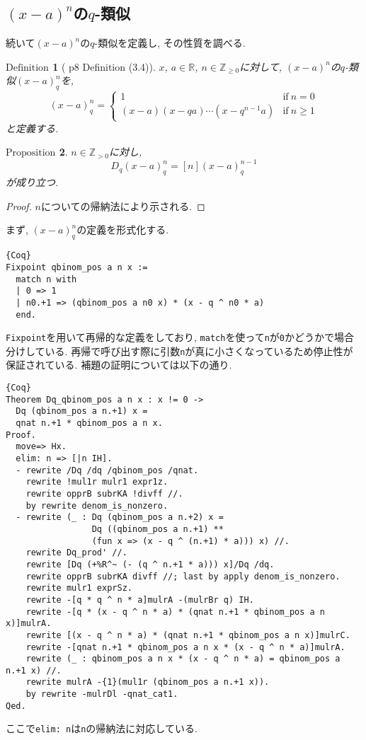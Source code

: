 \documentclass[11pt]{jsreport}
\theoremstyle{mystyle}
\newtheorem{df}{$\textrm{Definition}$}[subsection]
\newtheorem{prop}[df]{$\textrm{Proposition}$}
\newcommand{\bdf}{\begin{shadebox} \begin{df}}
\newcommand{\edf}{\end{df} \end{shadebox}}
\newcommand{\bprop}{\begin{shadebox} \begin{prop}}
\newcommand{\eprop}{\end{prop} \end{shadebox}}
\newcommand{\bpf}{\begin{proof}}
\newcommand{\epf}{\end{proof}}
\newcommand{\Z}{\mathbb{Z}}
\newcommand{\R}{\mathbb{R}}
\newcommand{\0}{\textbf{0}}
\newcommand{\1}{\textbf{1}}
\newcommand{\2}{\textbf{2}}
\begin{document}
\subsection{$(x - a)^n$の$q$-類似}
続いて$(x - a)^n$の$q$-類似を定義し, その性質を調べる.  
\bdf[\cite{Kac} p8 Definition (3.4)]
  $x$, $a \in \R$, $n \in \Z_{\ge 0}$に対して, $(x - a)^n$の$q$-類似$(x - a)^n_q$を, 
  \[
  (x - a)^n_q = \begin{cases}
                      1 & \text{if}\ n = 0 \\
                      (x - a) (x - qa) \cdots (x - q^{n - 1} a) & \text{if}\ n \ge 1
                    \end{cases}
  \]
  と定義する. 
\edf
\bprop \label{Dq_qbinom_nonneg}
  $n\in\Z_{>0}$に対し, 
  \[
    D_q(x-a)^n_q = [n](x-a)^{n-1}_q
  \]
  が成り立つ. 
\eprop
\bpf
  $n$についての帰納法により示される. 
\epf
まず, $(x - a)^n_q$の定義を形式化する. 
\begin{lstlisting}{Coq}
Fixpoint qbinom_pos a n x :=
  match n with
  | 0 => 1
  | n0.+1 => (qbinom_pos a n0 x) * (x - q ^ n0 * a)
  end. \end{lstlisting}
{\tt Fixpoint}を用いて再帰的な定義をしており, {\tt match}を使って{\tt n}が{\tt 0}かどうかで場合分けしている. 再帰で呼び出す際に引数{\tt n}が真に小さくなっているため停止性が保証されている. 補題の証明については以下の通り. 
\begin{lstlisting}{Coq}
Theorem Dq_qbinom_pos a n x : x != 0 ->
  Dq (qbinom_pos a n.+1) x =
  qnat n.+1 * qbinom_pos a n x.
Proof.
  move=> Hx.
  elim: n => [|n IH].
  - rewrite /Dq /dq /qbinom_pos /qnat.
    rewrite !mul1r mulr1 expr1z.
    rewrite opprB subrKA !divff //.
    by rewrite denom_is_nonzero.
  - rewrite (_ : Dq (qbinom_pos a n.+2) x =
                 Dq ((qbinom_pos a n.+1) **
                 (fun x => (x - q ^ (n.+1) * a))) x) //.
    rewrite Dq_prod' //.
    rewrite [Dq (+%R^~ (- (q ^ n.+1 * a))) x]/Dq /dq.
    rewrite opprB subrKA divff //; last by apply denom_is_nonzero.
    rewrite mulr1 exprSz.
    rewrite -[q * q ^ n * a]mulrA -(mulrBr q) IH.
    rewrite -[q * (x - q ^ n * a) * (qnat n.+1 * qbinom_pos a n x)]mulrA.
    rewrite [(x - q ^ n * a) * (qnat n.+1 * qbinom_pos a n x)]mulrC.
    rewrite -[qnat n.+1 * qbinom_pos a n x * (x - q ^ n * a)]mulrA.
    rewrite (_ : qbinom_pos a n x * (x - q ^ n * a) = qbinom_pos a n.+1 x) //.
    rewrite mulrA -{1}(mul1r (qbinom_pos a n.+1 x)).
    by rewrite -mulrDl -qnat_cat1.
Qed.
\end{lstlisting}
ここで{\tt elim:\,n}は{\tt n}の帰納法に対応している. 
\end{document}
